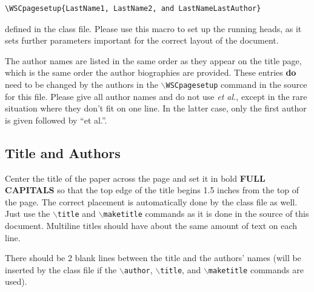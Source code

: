 \documentclass{wscpaperproc}
\theoremstyle{wsc}
\begin{document}
\begin{verbatim}
\WSCpagesetup{LastName1, LastName2, and LastNameLastAuthor}

\end{verbatim}
defined in the class file.
Please use this macro to set up the running heads, as it sets further parameters important for the correct layout of the document.

The author names are listed in the same order as they appear on the title page, which is the same order the author biographies are provided.
These entries {\bf do} need to be changed by the authors in the {\tt $\backslash$WSCpagesetup} command in the source for this file.
Please give all author names and do not use \textit{et al.}, except in the rare situation where they don't fit on one line. In the latter case, only the first author is given followed by ``et al.''.


\subsection{Title and Authors}
Center the title of the paper across the page and set it in bold {\bf FULL CAPITALS} so that the top edge of the title begins 1.5 inches from the top of the page.
The correct placement is automatically done by the class file as well.
Just use the {\tt $\backslash$title} and {\tt $\backslash$maketitle} commands as it is done in the source of this document.
Multiline titles should have about the same amount of text on each line.

There should be 2 blank lines between the title and the authors' names (will be inserted by the class file if the {\tt $\backslash$author}, {\tt $\backslash$title}, and {\tt $\backslash$maketitle} commands are used).
\end{document}

